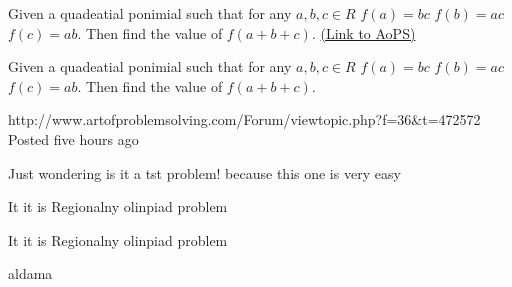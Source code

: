 \begin{problem}
	Given a quadeatial ponimial such that for any $a,b,c \in R$ $ f(a)=bc$  $f(b)=ac$  $f(c)=ab$. Then  find the value of $f(a+b+c)$.
	\flushright \href{https://artofproblemsolving.com/community/c6h472601}{(Link to AoPS)}
\end{problem}



\begin{solution}
	\begin{tcolorbox}Given a quadeatial ponimial such that for any $a,b,c \in R$ $ f(a)=bc$  $f(b)=ac$  $f(c)=ab$. Then  find the value of $f(a+b+c)$.\end{tcolorbox}
http://www.artofproblemsolving.com/Forum/viewtopic.php?f=36&t=472572
Posted five hours ago
\end{solution}



\begin{solution}
	Just wondering is it a tst problem! because this one is very easy
\end{solution}



\begin{solution}
	It it is Regionalny olinpiad problem
\end{solution}



\begin{solution}
	\begin{tcolorbox}It it is Regionalny olinpiad problem\end{tcolorbox}
aldama
\end{solution}



